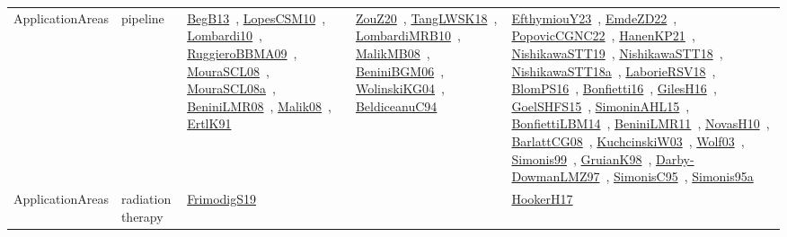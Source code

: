 {\begin{longtable}{lp{3cm}>{\raggedright\arraybackslash}p{6cm}>{\raggedright\arraybackslash}p{6cm}>{\raggedright\arraybackslash}p{8cm}}
ApplicationAreas & pipeline & \href{works/BegB13.pdf}{BegB13}~\cite{BegB13}, \href{works/LopesCSM10.pdf}{LopesCSM10}~\cite{LopesCSM10}, \href{works/Lombardi10.pdf}{Lombardi10}~\cite{Lombardi10}, \href{works/RuggieroBBMA09.pdf}{RuggieroBBMA09}~\cite{RuggieroBBMA09}, \href{works/MouraSCL08.pdf}{MouraSCL08}~\cite{MouraSCL08}, \href{works/MouraSCL08a.pdf}{MouraSCL08a}~\cite{MouraSCL08a}, \href{works/BeniniLMR08.pdf}{BeniniLMR08}~\cite{BeniniLMR08}, \href{works/Malik08.pdf}{Malik08}~\cite{Malik08}, \href{works/ErtlK91.pdf}{ErtlK91}~\cite{ErtlK91} & \href{works/ZouZ20.pdf}{ZouZ20}~\cite{ZouZ20}, \href{works/TangLWSK18.pdf}{TangLWSK18}~\cite{TangLWSK18}, \href{works/LombardiMRB10.pdf}{LombardiMRB10}~\cite{LombardiMRB10}, \href{works/MalikMB08.pdf}{MalikMB08}~\cite{MalikMB08}, \href{works/BeniniBGM06.pdf}{BeniniBGM06}~\cite{BeniniBGM06}, \href{works/WolinskiKG04.pdf}{WolinskiKG04}~\cite{WolinskiKG04}, \href{works/BeldiceanuC94.pdf}{BeldiceanuC94}~\cite{BeldiceanuC94} & \href{works/EfthymiouY23.pdf}{EfthymiouY23}~\cite{EfthymiouY23}, \href{works/EmdeZD22.pdf}{EmdeZD22}~\cite{EmdeZD22}, \href{works/PopovicCGNC22.pdf}{PopovicCGNC22}~\cite{PopovicCGNC22}, \href{works/HanenKP21.pdf}{HanenKP21}~\cite{HanenKP21}, \href{works/NishikawaSTT19.pdf}{NishikawaSTT19}~\cite{NishikawaSTT19}, \href{works/NishikawaSTT18.pdf}{NishikawaSTT18}~\cite{NishikawaSTT18}, \href{works/NishikawaSTT18a.pdf}{NishikawaSTT18a}~\cite{NishikawaSTT18a}, \href{works/LaborieRSV18.pdf}{LaborieRSV18}~\cite{LaborieRSV18}, \href{works/BlomPS16.pdf}{BlomPS16}~\cite{BlomPS16}, \href{works/Bonfietti16.pdf}{Bonfietti16}~\cite{Bonfietti16}, \href{works/GilesH16.pdf}{GilesH16}~\cite{GilesH16}, \href{works/GoelSHFS15.pdf}{GoelSHFS15}~\cite{GoelSHFS15}, \href{works/SimoninAHL15.pdf}{SimoninAHL15}~\cite{SimoninAHL15}, \href{works/BonfiettiLBM14.pdf}{BonfiettiLBM14}~\cite{BonfiettiLBM14}, \href{works/BeniniLMR11.pdf}{BeniniLMR11}~\cite{BeniniLMR11}, \href{works/NovasH10.pdf}{NovasH10}~\cite{NovasH10}, \href{works/BarlattCG08.pdf}{BarlattCG08}~\cite{BarlattCG08}, \href{works/KuchcinskiW03.pdf}{KuchcinskiW03}~\cite{KuchcinskiW03}, \href{works/Wolf03.pdf}{Wolf03}~\cite{Wolf03}, \href{works/Simonis99.pdf}{Simonis99}~\cite{Simonis99}, \href{works/GruianK98.pdf}{GruianK98}~\cite{GruianK98}, \href{works/Darby-DowmanLMZ97.pdf}{Darby-DowmanLMZ97}~\cite{Darby-DowmanLMZ97}, \href{works/SimonisC95.pdf}{SimonisC95}~\cite{SimonisC95}, \href{works/Simonis95a.pdf}{Simonis95a}~\cite{Simonis95a}\\
ApplicationAreas & radiation therapy & \href{works/FrimodigS19.pdf}{FrimodigS19}~\cite{FrimodigS19} &  & \href{works/HookerH17.pdf}{HookerH17}~\cite{HookerH17}\\

\end{longtable}}
